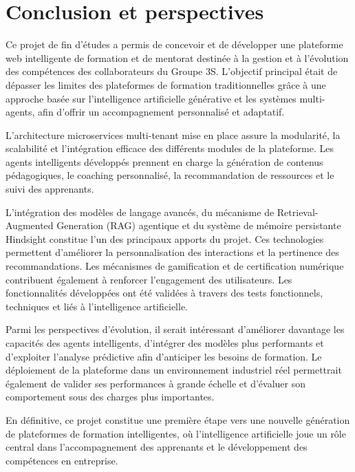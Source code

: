 \chapter*{Conclusion et perspectives}

Ce projet de fin d'études a permis de concevoir et de développer une plateforme web intelligente de formation et de mentorat destinée à la gestion et à l'évolution des compétences des collaborateurs du Groupe 3S. L'objectif principal était de dépasser les limites des plateformes de formation traditionnelles grâce à une approche basée sur l'intelligence artificielle générative et les systèmes multi-agents, afin d'offrir un accompagnement personnalisé et adaptatif.

L'architecture microservices multi-tenant mise en place assure la modularité, la scalabilité et l'intégration efficace des différents modules de la plateforme. Les agents intelligents développés prennent en charge la génération de contenus pédagogiques, le coaching personnalisé, la recommandation de ressources et le suivi des apprenants.

L'intégration des modèles de langage avancés, du mécanisme de Retrieval-Augmented Generation (RAG) agentique et du système de mémoire persistante Hindsight constitue l'un des principaux apports du projet. Ces technologies permettent d'améliorer la personnalisation des interactions et la pertinence des recommandations. Les mécanismes de gamification et de certification numérique contribuent également à renforcer l'engagement des utilisateurs. Les fonctionnalités développées ont été validées à travers des tests fonctionnels, techniques et liés à l'intelligence artificielle.

Parmi les perspectives d'évolution, il serait intéressant d'améliorer davantage les capacités des agents intelligents, d'intégrer des modèles plus performants et d'exploiter l'analyse prédictive afin d'anticiper les besoins de formation. Le déploiement de la plateforme dans un environnement industriel réel permettrait également de valider ses performances à grande échelle et d'évaluer son comportement sous des charges plus importantes.

En définitive, ce projet constitue une première étape vers une nouvelle génération de plateformes de formation intelligentes, où l'intelligence artificielle joue un rôle central dans l'accompagnement des apprenants et le développement des compétences en entreprise.
